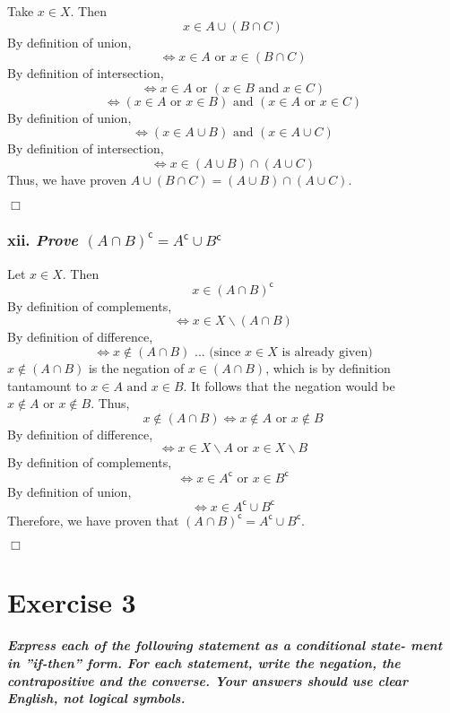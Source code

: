 \documentclass[
]{article}
\begin{document}
Take \(x \in X\). Then \[x \in A \cup (B \cap C)\] By definition of
union, \[\iff x \in A \text{ or } x \in (B \cap C)\] By definition of
intersection,
\[ \iff x \in A \text{ or } (x \in B \text{ and }x \in C)\]
\[ \iff (x \in A \text{ or } x \in B) \text{ and } (x \in A \text{ or } x \in C)\]
By definition of union,
\[\iff (x \in A \cup B) \text{ and } (x \in A \cup C)\] By definition of
intersection, \[\iff x \in (A \cup B) \cap (A \cup C)\] Thus, we have
proven \(A \cup (B \cap C) = (A \cup B) \cap (A \cup C)\).

\hfill \(\Box\)

\hypertarget{xii.-prove-a-cap-bmathsfc-amathsfc-cup-bmathsfc}{%
\subsubsection{\texorpdfstring{xii. \emph{Prove
\((A \cap B)^\mathsf{c} = A^\mathsf{c} \cup B^\mathsf{c}\)}}{xii. Prove (A \textbackslash cap B)\^{}\textbackslash mathsf\{c\} = A\^{}\textbackslash mathsf\{c\} \textbackslash cup B\^{}\textbackslash mathsf\{c\}}}\label{xii.-prove-a-cap-bmathsfc-amathsfc-cup-bmathsfc}}

Let \(x \in X\). Then \[x \in (A \cap B)^\mathsf{c}\] By definition of
complements, \[\iff x \in X \backslash (A \cap B)\] By definition of
difference,
\[\iff x \notin (A \cap B) \text{ ... (since } x \in X \text{ is already given)}\]
\(x \notin (A \cap B)\) is the negation of \(x \in (A \cap B)\), which
is by definition tantamount to \(x \in A \text{ and } x \in B\). It
follows that the negation would be
\(x \notin A \text{ or } x \notin B\). Thus,
\[x \notin (A \cap B) \iff x \notin A \text{ or } x \notin B\] By
definition of difference,
\[\iff x \in X \backslash A \text{ or } x \in X \backslash B\] By
definition of complements,
\[\iff x \in A^\mathsf{c} \text{ or } x \in B^\mathsf{c}\] By definition
of union, \[\iff x \in A^\mathsf{c} \cup B^\mathsf{c}\] Therefore, we
have proven that
\((A \cap B)^\mathsf{c} = A^\mathsf{c} \cup B^\mathsf{c}\).

\hfill \(\Box\)

\hypertarget{exercise-3}{%
\section{Exercise 3}\label{exercise-3}}

\textbf{\emph{Express each of the following statement as a conditional
state- ment in ''if-then'' form. For each statement, write the negation,
the contrapositive and the converse. Your answers should use clear
English, not logical symbols.}}
\end{document}
